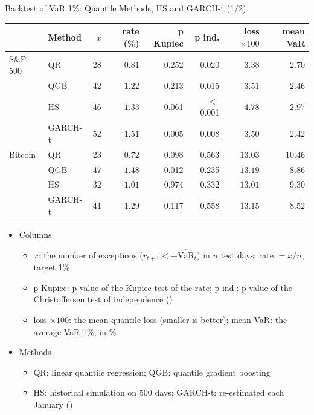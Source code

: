 \begin{frame}{Backtest of VaR 1\%: Quantile Methods, HS and GARCH-t (1/2)}
\itemsize{\footnotesize}
\begin{center}
\scriptsize
\begin{tabular}{llrrrrrr}
\toprule
& Method & $x$ & rate (\%) & p Kupiec & p ind. & loss $\times 100$ & mean VaR \\
\midrule
S\&P 500 & QR & 28 & $0.81$ & 0.252 & 0.020 & $3.38$ & $2.70$ \\
 & QGB & 42 & $1.22$ & 0.213 & 0.015 & $3.51$ & $2.46$ \\
 & HS & 46 & $1.33$ & 0.061 & $<$\,0.001 & $4.78$ & $2.97$ \\
 & GARCH-t & 52 & $1.51$ & 0.005 & 0.008 & $3.50$ & $2.42$ \\
\midrule
Bitcoin & QR & 23 & $0.72$ & 0.098 & 0.563 & $13.03$ & $10.46$ \\
 & QGB & 47 & $1.48$ & 0.012 & 0.235 & $13.19$ & $8.86$ \\
 & HS & 32 & $1.01$ & 0.974 & 0.332 & $13.01$ & $9.30$ \\
 & GARCH-t & 41 & $1.29$ & 0.117 & 0.558 & $13.15$ & $8.52$ \\
\bottomrule
\end{tabular}
\end{center}
\begin{itemize}
    \item Columns
    \begin{itemize}
        \item $x$: the number of exceptions ($r_{t+1} < -\widehat{\mathrm{VaR}}_t$) in $n$ test days; rate $= x/n$, target 1\%
        \item p Kupiec: p-value of the Kupiec test of the rate; p ind.: p-value of the Christoffersen test of independence ()
        \item loss $\times 100$: the mean quantile loss (smaller is better); mean VaR: the average VaR 1\%, in \%
    \end{itemize}
    \item Methods
    \begin{itemize}
        \item QR: linear quantile regression; QGB: quantile gradient boosting
        \item HS: historical simulation on 500 days; GARCH-t: re-estimated each January ()
    \end{itemize}
\end{itemize}
\end{frame}

